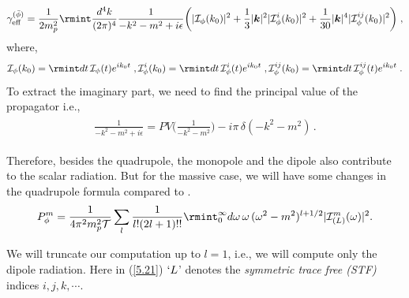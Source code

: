 \begin{equation}
  \gamma_{\text{eff}}^{(\bar\phi)} = \frac{1}{2 m_p^2} \rmint \frac{d^4 k}{(2 \pi)^4} \frac{1}{-k^2-m^2 +i \epsilon} \bigg( | \mathcal{I}_\phi (k_0)|^2 + \frac{1}{3} |\boldsymbol{k}|^2   | \mathcal{I}_\phi^i (k_0)|^2 + \frac{1}{30} |\boldsymbol{k}|^4   | \mathcal{I}_\phi^{ij} (k_0)|^2  \bigg) \;, \label{5.18n}
\end{equation}
where, 
\begin{equation}
\mathcal{I}_\phi(k_0) = \rmint dt \,\mathcal{I}_\phi (t) e^{i k_0 t} \;, \mathcal{I}_{\phi}^{i}(k_0) = \rmint dt \,\mathcal{I}_\phi^i (t) e^{i k_0 t} \;, \mathcal{I}_{\phi}^{ij}(k_0) = \rmint dt \,\mathcal{I}_\phi^{ij} (t) e^{i k_0 t} \;.
\end{equation}
To extract the imaginary part, we need to find  the principal value of the propagator i.e.,
\begin{align}
    \begin{split}
        \frac{1}{-k^2-m^2+i\epsilon}=PV\Big(\frac{1}{-k^2-m^2}\Big)-i\pi\,\delta(-k^2-m^2)\,.
    \end{split}
\end{align}

Therefore, besides the quadrupole,  the monopole and the dipole also contribute to the scalar radiation. 
But for the massive case, we will have some changes in the quadrupole formula compared to \cite{Kuntz:2019zef}.
\begin{align}
    \begin{split}
        P_{\phi}^m=\frac{1}{4\pi^2 m_p^2\mathcal{T}}\sum_{l}\frac{1}{l!(2l+1)!!}\rmint_0^\infty d\omega\,\omega\,(\omega^2-m^2)^{l+1/2}|\mathcal{I}^{m}_{(L)}(\omega)|^2 .
        \label{5.21}
    \end{split}
\end{align}

We will truncate our computation up to $l=1$, i.e., we will compute only the dipole radiation. Here in (\ref{5.21}) $`L$' denotes the \textit{symmetric trace free (STF)} indices $i,j,k,\cdots.$

